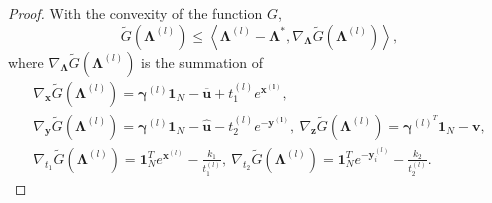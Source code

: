 \documentclass[review,hidelinks,onefignum,onetabnum]{siamart220329}
\begin{document}
\begin{proof}
With the convexity of the function $G$, 
\begin{equation*}
    \widetilde{G}\left(\bm{\Lambda}^{(l)}\right)
    \leq \left\langle \bm{\Lambda}^{(l)} -\bm{\Lambda}^*, \nabla_{\bm{\Lambda}}\widetilde{G}\left(\bm{\Lambda}^{(l)}\right) \right\rangle, 
\end{equation*}
where $\nabla_{\bm{\Lambda}}\widetilde{G}\left(\bm{\Lambda}^{(l)}\right)$ is the summation of
\begin{multline*}
    \nabla_{\bm{x}}\widetilde{G}\left(\bm{\Lambda}^{(l)}\right) = \bm{\gamma}^{(l)}\bm{1}_N-\bm{\overline{u}}+t_1^{(l)} e^{\bm{x^{(l)}}}, \\ 
    \nabla_{\bm{y}}\widetilde{G}\left(\bm{\Lambda}^{(l)}\right) = \bm{\gamma}^{(l)}\bm{1}_N-\bm{\hat{u}}-t_2^{(l)} e^{\bm{-y^{(l)}}}, \
    \nabla_{\bm{z}}\widetilde{G}\left(\bm{\Lambda}^{(l)}\right) = \bm{\gamma}^{(l)^T}\bm{1}_N-\bm{v}, \\
    \nabla_{t_1}\widetilde{G}\left(\bm{\Lambda}^{(l)}\right) = \bm{1}_N^{T}e^{\bm{x}^{(l)}}-\frac{k_1}{t_1^{(l)}}, \
    \nabla_{t_2}\widetilde{G}\left(\bm{\Lambda}^{(l)}\right) = \bm{1}_N^{T}e^{-\bm{y}_i^{(l)}}-\frac{k_2}{t_2^{(l)}}. 
\end{multline*}


\end{proof}
\end{document}
